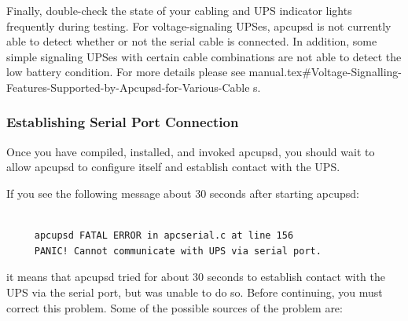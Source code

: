 {{{{{{{{{{Finally, double-check the state of your cabling and UPS indicator lights
frequently during testing.  For voltage-signaling UPSes, apcupsd is not
currently able to detect whether or not the serial cable is connected. In
addition, some simple signaling UPSes with certain cable combinations are not
able to detect the low battery condition.  For more details please see 
{manual.tex#Voltage-Signalling-Features-Supported-by-Apcupsd-for-Various-Cable%
s}. 

\label{Establishing-Serial-Port-Connection}

\subsubsection*{Establishing Serial Port Connection}

\label{index-Testing_002c-Serial-221}
Once you have compiled, installed, and invoked apcupsd, you should wait to
allow apcupsd to configure itself and establish contact with the UPS.  

If you see the following message about 30 seconds after starting apcupsd: 

\footnotesize
\begin{verbatim}
     
     apcupsd FATAL ERROR in apcserial.c at line 156
     PANIC! Cannot communicate with UPS via serial port.
\end{verbatim}
\normalsize

it means that apcupsd tried for about 30 seconds to establish contact with the
UPS via the serial port, but was unable to do so. Before continuing, you must
correct this problem. Some of the possible sources of the problem are:  

}}}}}}}}}}
